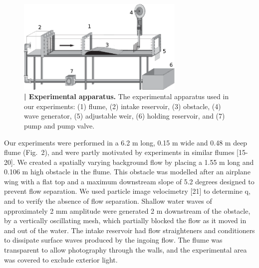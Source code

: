 \documentclass[12pt,aps%
]{revtex4}
\begin{document}
\begin{figure}
\begin{center}
\includegraphics[width=80mm]{waterfall-2.eps}
\caption{{\bf  | Experimental apparatus.} The experimental apparatus used in
our experiments: (1) flume, (2) intake reservoir, (3) obstacle, (4) wave
generator, (5) adjustable weir, (6) holding reservoir, and (7) pump and pump
valve.
}
\end{center}
\end{figure}

Our experiments were performed in a 6.2 m long, 0.15 m wide and 0.48 m deep
flume (Fig.\ 2), and were partly motivated by experiments in similar flumes
[15-20]. We created a spatially varying background flow by placing a 1.55 m
long and 0.106 m high obstacle in the flume. This obstacle was modelled after
an airplane wing with a flat top and a maximum downstream slope of 5.2 degrees
designed to prevent flow separation. We used particle image velocimetry [21]
to determine q, and to verify the absence of flow separation. Shallow water
waves of approximately 2 mm amplitude were
generated 2 m downstream of the obstacle, by a vertically oscillating mesh,
which partially blocked the flow as it moved in and out of the water. The
intake reservoir had flow straighteners and conditioners to dissipate surface
waves produced by the ingoing flow. The flume was transparent to allow
photography through the walls, and the experimental area was covered to
exclude exterior light.
\end{document}
